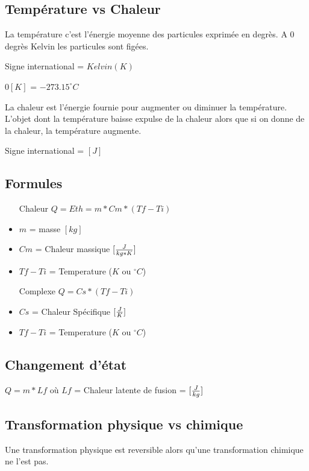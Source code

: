 \subsection{Température vs Chaleur}
La température c'est l'énergie moyenne des particules exprimée en degrès.
A 0 degrès Kelvin les particules sont figées.

Signe international = $Kelvin (K)$ 

$0[K]$ = $-273.15^{\circ}C$


La chaleur est l'énergie fournie pour augmenter ou diminuer la température.
L'objet dont la température baisse expulse de la chaleur alors que si on donne de la chaleur, la température augmente.

Signe international = $[J]$

\subsection{Formules}
\begin{itemize}
    \item[Chaleur] $Q = Eth=m*Cm*(Tf-Ti)$ 
    \item $m$ = masse $[kg]$
    \item $Cm$ = Chaleur massique $[\frac{J}{kg*K}]$
    \item $Tf-Ti$ = Temperature ($K$ ou $^{\circ}C$)
    \item[Complexe] $Q = Cs * (Tf - Ti)$
    \item $Cs$ = Chaleur Spécifique $[\frac{J}{K}]$
    \item $Tf-Ti$ = Temperature ($K$ ou $^{\circ}C$)
\end{itemize}

\subsection{Changement d'état}
$Q = m * Lf$
où $Lf$ = Chaleur latente de fusion = $[\frac{J}{kg}]$
\subsection{Transformation physique vs chimique}
Une transformation physique est reversible alors qu'une transformation chimique ne l'est pas.
